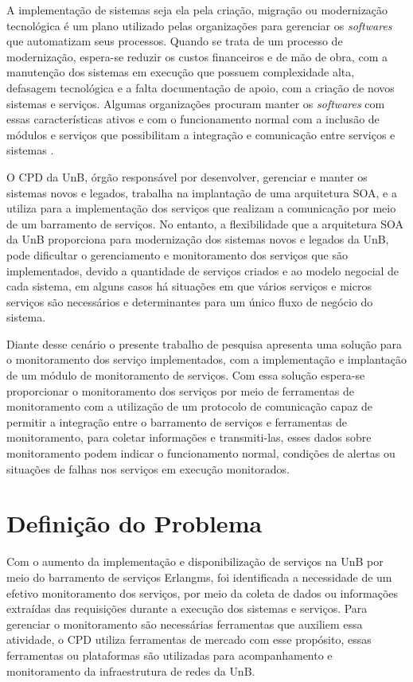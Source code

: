 \label{Introducao}

A implementação de sistemas seja ela pela criação, migração ou modernização tecnológica é um plano utilizado pelas organizações para gerenciar os \textit{softwares} que automatizam seus processos. Quando se trata de um processo de modernização, espera-se reduzir os custos financeiros e de mão de obra, com a manutenção dos sistemas em execução que possuem complexidade alta, defasagem tecnológica e a falta documentação de apoio, com a criação de novos sistemas e serviços. Algumas organizações procuram manter os \textit{softwares} com essas características ativos e com o funcionamento normal com a inclusão de módulos e serviços que possibilitam a integração e comunicação entre serviços e sistemas \cite{Agilar}.

O \acrshort{CPD} da \acrshort{UnB}, órgão responsável por desenvolver, gerenciar e manter os sistemas novos e legados, trabalha na implantação de uma arquitetura \acrshort{SOA}, e a utiliza para a implementação dos serviços que realizam a comunicação por meio de um barramento de serviços. No entanto, a flexibilidade que a arquitetura \acrshort{SOA} da \acrshort{UnB} proporciona para modernização dos sistemas novos e legados da \acrshort{UnB}, pode dificultar o gerenciamento e monitoramento dos serviços que são implementados, devido a quantidade de serviços criados e ao modelo negocial de cada sistema, em alguns casos há situações em que vários serviços e micros serviços são necessários e determinantes para um único fluxo de negócio do sistema.

Diante desse cenário o presente trabalho de pesquisa apresenta uma solução para o monitoramento dos serviço implementados, com a implementação e implantação de um módulo de monitoramento de serviços. Com essa solução espera-se proporcionar o monitoramento dos serviços por meio de ferramentas de monitoramento com a utilização de um protocolo de comunicação capaz de permitir a integração entre o barramento de serviços e ferramentas de monitoramento, para coletar informações e transmiti-las, esses dados sobre monitoramento podem indicar o funcionamento normal, condições de alertas ou situações de falhas nos serviços em execução monitorados.


\section{Definição do Problema}
Com o aumento da implementação e disponibilização de serviços na \acrshort{UnB} por meio do barramento de serviços Erlangms\cite{Agilar}, foi identificada a necessidade de um efetivo monitoramento dos serviços, por meio da coleta de dados ou informações extraídas das requisições durante a execução dos sistemas e serviços. Para gerenciar o monitoramento são necessárias ferramentas que auxiliem essa atividade, o \acrshort{CPD} utiliza ferramentas de mercado com esse propósito, essas ferramentas ou plataformas são utilizadas para acompanhamento e monitoramento da infraestrutura de redes da \acrshort{UnB}.


